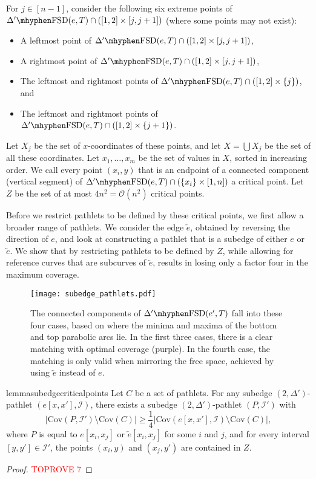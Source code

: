 \documentclass[a4paper,UKenglish,cleveref,thm-restate,notab]{lipics-v2021}
\newcommand{\FSD}[1][\Delta'] {\ensuremath{#1}\mhyphen\mathrm{FSD}}
\newcommand{\bigO}{\mathcal{O}}
\newcommand{\I}{\mathcal{I}}
\newcommand{\rev}{\overleftarrow}
\newcommand{\Cov}{\ensuremath{\mathrm{Cov}}}
\begin{document}
    For $j \in [n-1]$, consider the following six extreme points of $\FSD(e, T) \cap ([1, 2] \times [j, j+1])$ (where some points may not exist):
    \begin{itemize}
        \item A leftmost point of $\FSD(e, T) \cap ([1, 2] \times [j, j+1])$,
        \item A rightmost point of $\FSD(e, T) \cap ([1, 2] \times [j, j+1])$,
        \item The leftmost and rightmost points of $\FSD(e, T) \cap ([1, 2] \times \{j\})$, and
        \item The leftmost and rightmost points of $\FSD(e, T) \cap ([1, 2] \times \{j+1\})$.
    \end{itemize}
    Let $X_j$ be the set of $x$-coordinates of these points, and let $X = \bigcup X_j$ be the set of all these coordinates.
    Let $x_1, \dots, x_m$ be the set of values in $X$, sorted in increasing order.
    We call every point $(x_i, y)$ that is an endpoint of a connected component (vertical segment) of $\FSD(e, T) \cap (\{x_i\} \times [1, n])$ a critical point.
    Let $Z$ be the set of at most $4n^2 = \bigO(n^2)$ critical points.

    Before we restrict pathlets to be defined by these critical points, we first allow a broader range of pathlets.
    We consider the edge $\rev{e}$, obtained by reversing the direction of $e$, and look at constructing a pathlet that is a subedge of either $e$ or $\rev{e}$.
    We show that by restricting pathlets to be defined by $Z$, while allowing for reference curves that are subcurves of $\rev{e}$, results in losing only a factor four in the maximum coverage.
    
    \begin{figure}
        \centering
        \texttt{[image: subedge\_pathlets.pdf]}
        \caption{The connected components of $\FSD(e', T)$ fall into these four cases, based on where the minima and maxima of the bottom and top parabolic arcs lie.
        In the first three cases, there is a clear matching with optimal coverage (purple).
        In the fourth case, the matching is only valid when mirroring the free space, achieved by using $\rev{e}$ instead of $e$.}
        \label{fig:subedge_pathlets}
    \end{figure}


    \begin{restatable}{lemma}{subedgecriticalpoints}
     \label{lem:subedge_critical_points}
         Let $C$ be a set of pathlets.
        For any subedge $(2, \Delta')$-pathlet $(e[x, x'], \I)$, there exists a subedge $(2, \Delta')$-pathlet $(P, \I')$ with
        \[
            | \Cov(P, \I') \setminus \Cov(C) | \geq \frac{1}{4} | \Cov(e[x, x'], \I) \setminus \Cov(C) |,
        \]
        where $P$ is equal to $e[x_i, x_j]$ or $\rev{e}[x_i, x_j]$ for some $i$ and $j$, and for every interval $[y, y'] \in \I'$, the points $(x_i, y)$ and $(x_j, y')$ are contained in $Z$.        
    \end{restatable}
    \begin{proof}\textcolor{red}{TOPROVE 7}\end{proof}
\end{document}
